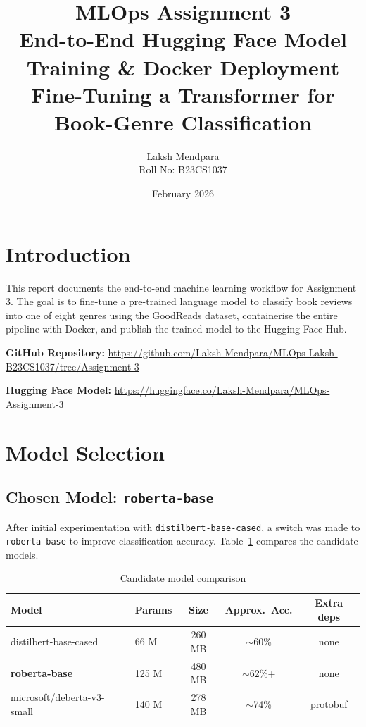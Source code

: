 \documentclass[12pt,a4paper]{article}
\title{%
    \textbf{MLOps Assignment 3}\\[6pt]
    \large End-to-End Hugging Face Model Training \& Docker Deployment\\[4pt]
    \normalsize Fine-Tuning a Transformer for Book-Genre Classification
}
\author{
    Laksh Mendpara\\
    Roll No: B23CS1037
}
\date{February 2026}
\begin{document}
\maketitle
\tableofcontents
\newpage

\section{Introduction}

This report documents the end-to-end machine learning workflow for
Assignment 3.  The goal is to fine-tune a pre-trained language model to
classify book reviews into one of eight genres using the GoodReads dataset,
containerise the entire pipeline with Docker, and publish the trained model to
the Hugging Face Hub.

\noindent\textbf{GitHub Repository:}
\url{https://github.com/Laksh-Mendpara/MLOps-Laksh-B23CS1037/tree/Assignment-3}

\noindent\textbf{Hugging Face Model:}
\url{https://huggingface.co/Laksh-Mendpara/MLOps-Assignment-3}

\section{Model Selection}

\subsection{Chosen Model: \texttt{roberta-base}}

After initial experimentation with \texttt{distilbert-base-cased}, a switch
was made to \texttt{roberta-base} to improve classification accuracy.
Table~\ref{tab:models} compares the candidate models.

\begin{table}[h]
\centering
\caption{Candidate model comparison}
\label{tab:models}
\begin{tabular}{llccc}
\toprule
\textbf{Model} & \textbf{Params} & \textbf{Size} & \textbf{Approx.\ Acc.} & \textbf{Extra deps} \\
\midrule
distilbert-base-cased       & 66 M  & 260 MB & $\sim$60\%   & none         \\
\textbf{roberta-base}       & 125 M & 480 MB & $\sim$62\%+  & none         \\
microsoft/deberta-v3-small  & 140 M & 278 MB & $\sim$74\%   & protobuf     \\
\bottomrule
\end{tabular}
\end{table}
\end{document}
